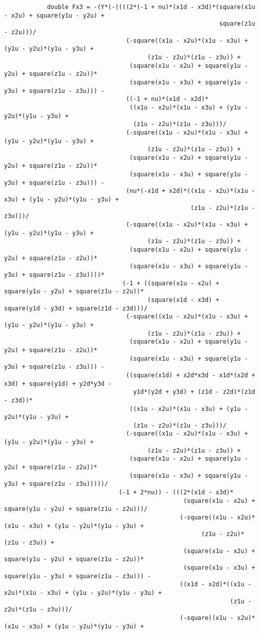 \begin{lstlisting}
			double Fx3 = -(Y*(-((((2*(-1 + nu)*(x1d - x3d)*(square(x1u - x2u) + square(y1u - y2u) + 
															square(z1u - z2u)))/
								  (-square((x1u - x2u)*(x1u - x3u) + (y1u - y2u)*(y1u - y3u) + 
										(z1u - z2u)*(z1u - z3u)) + 
								   (square(x1u - x2u) + square(y1u - y2u) + square(z1u - z2u))*
								   (square(x1u - x3u) + square(y1u - y3u) + square(z1u - z3u))) - 
								  ((-1 + nu)*(x1d - x2d)*
								   ((x1u - x2u)*(x1u - x3u) + (y1u - y2u)*(y1u - y3u) + 
									(z1u - z2u)*(z1u - z3u)))/
								  (-square((x1u - x2u)*(x1u - x3u) + (y1u - y2u)*(y1u - y3u) + 
										(z1u - z2u)*(z1u - z3u)) + 
								   (square(x1u - x2u) + square(y1u - y2u) + square(z1u - z2u))*
								   (square(x1u - x3u) + square(y1u - y3u) + square(z1u - z3u))) - 
								  (nu*(-x1d + x2d)*((x1u - x2u)*(x1u - x3u) + (y1u - y2u)*(y1u - y3u) + 
													(z1u - z2u)*(z1u - z3u)))/
								  (-square((x1u - x2u)*(x1u - x3u) + (y1u - y2u)*(y1u - y3u) + 
										(z1u - z2u)*(z1u - z3u)) + 
								   (square(x1u - x2u) + square(y1u - y2u) + square(z1u - z2u))*
								   (square(x1u - x3u) + square(y1u - y3u) + square(z1u - z3u))))*
								 (-1 + ((square(x1u - x2u) + square(y1u - y2u) + square(z1u - z2u))*
										(square(x1d - x3d) + square(y1d - y3d) + square(z1d - z3d)))/
								  (-square((x1u - x2u)*(x1u - x3u) + (y1u - y2u)*(y1u - y3u) + 
										(z1u - z2u)*(z1u - z3u)) + 
								   (square(x1u - x2u) + square(y1u - y2u) + square(z1u - z2u))*
								   (square(x1u - x3u) + square(y1u - y3u) + square(z1u - z3u))) - 
								  ((square(x1d) + x2d*x3d - x1d*(x2d + x3d) + square(y1d) + y2d*y3d - 
									y1d*(y2d + y3d) + (z1d - z2d)*(z1d - z3d))*
								   ((x1u - x2u)*(x1u - x3u) + (y1u - y2u)*(y1u - y3u) + 
									(z1u - z2u)*(z1u - z3u)))/
								  (-square((x1u - x2u)*(x1u - x3u) + (y1u - y2u)*(y1u - y3u) + 
										(z1u - z2u)*(z1u - z3u)) + 
								   (square(x1u - x2u) + square(y1u - y2u) + square(z1u - z2u))*
								   (square(x1u - x3u) + square(y1u - y3u) + square(z1u - z3u)))))/
								(-1 + 2*nu)) - (((2*(x1d - x3d)*
												  (square(x1u - x2u) + square(y1u - y2u) + square(z1u - z2u)))/
												 (-square((x1u - x2u)*(x1u - x3u) + (y1u - y2u)*(y1u - y3u) + 
													   (z1u - z2u)*(z1u - z3u)) + 
												  (square(x1u - x2u) + square(y1u - y2u) + square(z1u - z2u))*
												  (square(x1u - x3u) + square(y1u - y3u) + square(z1u - z3u))) - 
												 ((x1d - x2d)*((x1u - x2u)*(x1u - x3u) + (y1u - y2u)*(y1u - y3u) + 
															   (z1u - z2u)*(z1u - z3u)))/
												 (-square((x1u - x2u)*(x1u - x3u) + (y1u - y2u)*(y1u - y3u) + 

\end{lstlisting}
